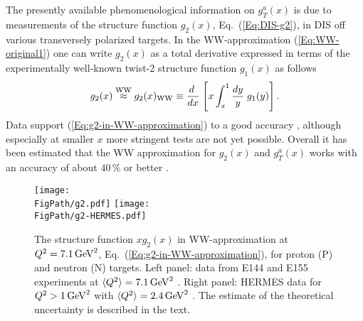 \documentclass[a4paper,11pt]{article}
\newcommand{\be}{\begin{equation}}
\newcommand{\ee}{\end{equation}}
\newcommand{\la}{\langle}
\newcommand{\ra}{\rangle}
\newcommand*{\FigPath}{./figs}%
\begin{document}
The presently available phenomenological information on $g_T^a(x)$ is due
to measurements of the structure function $g_2(x)$, Eq.~(\ref{Eq:DIS-g2}),
in DIS off various transversely polarized targets. In the WW-approximation
(\ref{Eq:WW-original1}) one can write $g_2(x)$ as a total derivative
expressed in terms of the experimentally well-known twist-2
structure function $g_1(x)$ as follows
\be
    	g_2(x) \stackrel{\rm WW}{\approx} g_2(x)_{\rm WW} \equiv
	\frac{ d\;}{ d x}\;\Biggl[x\int_x^1\frac{ d y}{y}
	\;g_1(y)\Biggr]\,.\label{Eq:g2-in-WW-approximation}
\ee
Data support (\ref{Eq:g2-in-WW-approximation}) to a good accuracy
\cite{Anthony:2002hy,Adams:1994id,Abe:1998wq,Airapetian:2011wu}, although especially
at smaller $x$ more stringent tests are not yet possible. Overall it has
been estimated that the WW approximation for $g_2(x)$ and $g_T^a(x)$ works
with an accuracy of about $40\,\%$ or better \cite{Accardi:2009au}.

\begin{figure}[b!]
\centering
\texttt{[image: \\FigPath/g2.pdf]}
\texttt{[image: \\FigPath/g2-HERMES.pdf]}
\caption{\label{Fig:g2}
The structure function $xg_2(x)$ in WW-approximation at $Q^2=7.1\,{\rm GeV}^2$,
Eq.~(\ref{Eq:g2-in-WW-approximation}), for proton (P) and neutron (N) targets.
Left panel: data from E144 and E155 experiments at
$\la Q^2\ra=7.1\,{\rm GeV}^2$ \cite{Anthony:2002hy,Abe:1998wq}.
Right panel: HERMES data for $Q^2>1\,{\rm GeV}^2$ with
$\la Q^2\ra=2.4\,{\rm GeV}^2$ \cite{Airapetian:2011wu}.
The estimate of the theoretical uncertainty is described in the text.}
\end{figure}
\end{document}
